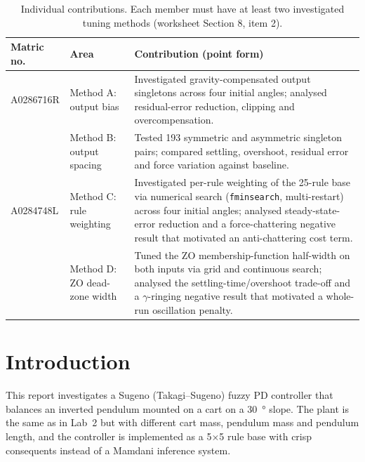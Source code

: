 \documentclass[11pt,a4paper]{article}
\newcommand{\gam}{\ensuremath{\gamma}}
\begin{document}
\begin{table}[H]
\centering
\small
\begin{tabular}{@{}p{2.6cm}p{3.4cm}p{9.2cm}@{}}
\toprule
\textbf{Matric no.} & \textbf{Area} & \textbf{Contribution (point form)} \\
\midrule
A0286716R & Method A: output bias & Investigated gravity-compensated output singletons across four initial angles; analysed residual-error reduction, clipping and overcompensation. \\
          & Method B: output spacing & Tested 193 symmetric and asymmetric singleton pairs; compared settling, overshoot, residual error and force variation against baseline. \\[0.4em]
A0284748L & Method C: rule weighting & Investigated per-rule weighting of the 25-rule base via numerical search (\texttt{fminsearch}, multi-restart) across four initial angles; analysed steady-state-error reduction and a force-chattering negative result that motivated an anti-chattering cost term. \\
          & Method D: ZO dead-zone width & Tuned the ZO membership-function half-width on both inputs via grid and continuous search; analysed the settling-time/overshoot trade-off and a $\gam$-ringing negative result that motivated a whole-run oscillation penalty. \\[0.4em]
\bottomrule
\end{tabular}
\caption{Individual contributions. Each member must have at least two
investigated tuning methods (worksheet Section 8, item 2).}
\label{tab:contributions}
\end{table}

\clearpage

\section{Introduction}
\label{sec:intro}

This report investigates a Sugeno (Takagi--Sugeno) \cite{takagi1985fuzzy}
fuzzy PD controller that
balances an inverted pendulum mounted on a cart on a \SI{30}{\degree} slope.
The plant is the same as in Lab~2 but with different cart mass, pendulum mass
and pendulum length, and the controller is implemented as a 5$\times$5 rule
base with crisp consequents instead of a Mamdani inference system.
\end{document}
